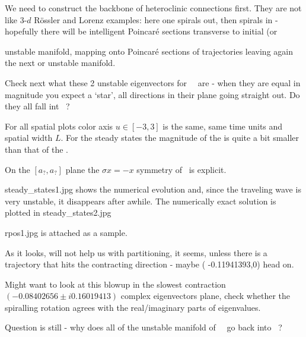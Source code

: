 We need to construct the backbone of heteroclinic connections
first. They are not like 3-$d$ R\"ossler and Lorenz examples:
here one spirals out,
then spirals in - hopefully there will be intelligent Poincar\'e sections
transverse to initial  (or { unstable manifold, mapping onto
Poincar\'e sections of trajectories leaving again
the next  or  unstable manifold.


Check next what these 2 unstable eigenvectors for ~\eqv\ are - when they
are equal in magnitude you expect a `star', all directions in their plane
going straight out. Do they all fall int ~\eqv?

%

For all spatial plots color axis $u \in [-3, 3]$ is the same,
same time units and spatial width $L$.
For the steady states the magnitude of the  is quite
a bit smaller than that of the .

On the
    $[a_?,a_?]$ plane
    the $\sigma x = -x$ symmetry of \KSe\ is explicit.


steady\_states1.jpg shows the numerical evolution and, since the
traveling wave is very unstable, it disappears after awhile.
The numerically exact solution is plotted in steady\_states2.jpg

rpos1.jpg is attached as a sample.

As it looks, will not help us with partitioning, it seems, unless there is
a trajectory that hits the contracting direction - maybe
( -0.11941393,0)
head on.

Might want to look at this blowup in
the  slowest contraction
$   ( -0.08402656 \pm i 0.16019413)$
complex eigenvectors plane, check whether the
spiralling rotation agrees with the real/imaginary parts of eigenvalues.

Question is still - why does all of the unstable manifold of
~\eqv\ go back
into
~\eqv?

}
